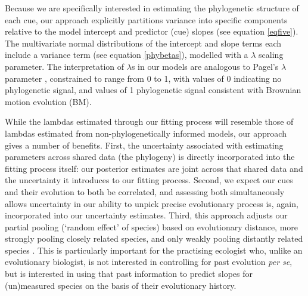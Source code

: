 \documentclass[11pt]{article}
\begin{document}
Because we are specifically interested in estimating the phylogenetic structure of each cue, our approach explicitly partitions variance into specific components relative to the model intercept and predictor (cue) slopes (see equation \ref{eqfive}). The multivariate normal distributions of the intercept and slope terms each include a variance term (see equation \ref{phybetas}), modelled with a $\lambda$ scaling parameter. The interpretation of $\lambda$s in our models are analogous to Pagel's $\lambda$  \citep{pagel1999inferring} parameter \citep{housworth2004phylogenetic}, constrained to range from 0 to 1, with values of 0 indicating no phylogenetic signal, and values of 1 phylogenetic signal consistent with Brownian motion evolution (BM). 


While the lambdas estimated through our fitting process will resemble those of lambdas estimated from non-phylogenetically informed models, our approach gives a number of benefits. First, the uncertainty associated with estimating parameters across shared data (the phylogeny) is directly incorporated into the fitting process itself: our posterior estimates are joint across that shared data and the uncertainty it introduces to our fitting process. Second, we expect our cues and their evolution to both be correlated, and assessing both simultaneously allows uncertainty in our ability to unpick precise evolutionary process is, again, incorporated into our uncertainty estimates. Third, this approach adjusts our partial pooling (`random effect' of species) based on evolutionary distance, more strongly pooling closely related species, and only weakly pooling distantly related species \citep[see Gaussian process models in][]{BDA}. This is particularly important for the practising ecologist who, unlike an evolutionary biologist, is not interested in controlling for past evolution \emph{per se}, but is interested in using that past information to predict slopes for (un)measured species on the basis of their evolutionary history.

\end{document}
